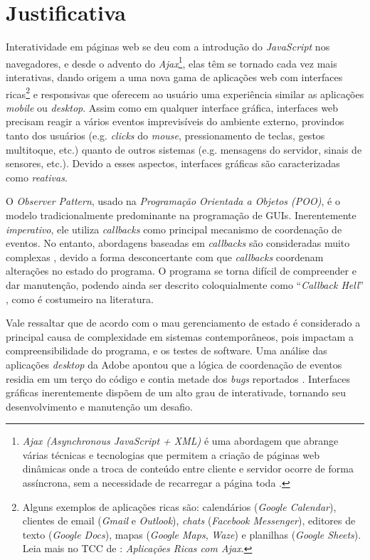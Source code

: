 \section{Justificativa}\label{ljustificativa}

Interatividade em páginas web se deu com a
introdução do \emph{JavaScript} nos navegadores,
e desde o advento do \emph{Ajax}\footnote{
  \emph{Ajax (Asynchronous JavaScript + XML)} é uma
  abordagem que abrange várias técnicas e
  tecnologias que permitem a criação de páginas web
  dinâmicas onde a troca de conteúdo entre cliente e
  servidor ocorre de forma assíncrona, sem a necessidade
  de recarregar a página toda \cite{garrett2005ajax}.
},
elas têm se tornado cada vez mais interativas,
dando origem a uma nova gama de aplicações web com interfaces
ricas\footnote{
  Alguns exemplos de aplicações ricas são:
  calendários (\emph{Google Calendar}),
  clientes de email (\emph{Gmail} e \emph{Outlook}),
  \emph{chats} (\emph{Facebook Messenger}),
  editores de texto (\emph{Google Docs}),
  mapas (\emph{Google Maps}, \emph{Waze}) e
  planilhas (\emph{Google Sheets}).
  Leia mais no TCC de :
  \emph{Aplicações Ricas com Ajax}.
} e responsivas que oferecem ao usuário uma experiência
similar as aplicações \emph{mobile} ou \emph{desktop}.
Assim como em qualquer interface gráfica, interfaces web
precisam reagir a vários eventos imprevisíveis do ambiente
externo, provindos tanto dos usuários (e.g. \emph{clicks}
do \emph{mouse}, pressionamento de teclas, gestos multitoque,
etc.) quanto de outros sistemas (e.g. mensagens do servidor,
sinais de sensores, etc.).
Devido a esses aspectos, interfaces gráficas são caracterizadas
como \emph{reativas}.

O \emph{Observer Pattern}, usado na \emph{Programação Orientada
a Objetos (POO)}, é o modelo tradicionalmente predominante na
programação de GUIs.
Inerentemente \emph{imperativo}, ele utiliza \emph{callbacks}
como principal mecanismo de coordenação de eventos.
No entanto, abordagens baseadas em \emph{callbacks} são
consideradas muito complexas \cite{
  edwards2009coherent,
  fischer2007tasks,
  maier2010deprecating,
  reppy1992higher},
devido a forma desconcertante com que \emph{callbacks}
coordenam alterações no estado do programa.
O programa se torna difícil de compreender e dar manutenção,
podendo ainda ser descrito coloquialmente como \enquote{\emph{Callback Hell}}
\cite[p.~2]{edwards2009coherent}, como é costumeiro na literatura.

Vale ressaltar que de acordo com 
o mau gerenciamento de estado é considerado a principal
causa de complexidade em sistemas contemporâneos, pois
impactam a compreensibilidade do programa, e os testes
de software.
Uma análise das aplicações \emph{desktop} da Adobe
apontou que a lógica de coordenação de eventos residia
em um terço do código e contia metade dos \emph{bugs}
reportados \cite{jarvi2008property}.
Interfaces gráficas inerentemente dispõem de um alto
grau de interativade, tornando seu desenvolvimento e
manutenção um desafio.

